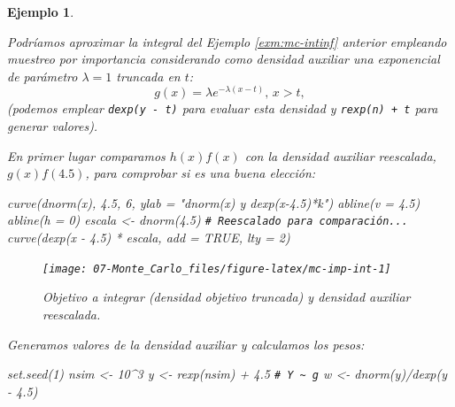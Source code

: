 \documentclass[
  10pt,
]{book}
\newenvironment{Shaded}{\begin{snugshade}}{\end{snugshade}}
\newcommand{\AttributeTok}[1]{\textcolor[rgb]{0.77,0.63,0.00}{#1}}
\newcommand{\CommentTok}[1]{\textcolor[rgb]{0.56,0.35,0.01}{\textit{#1}}}
\newcommand{\ConstantTok}[1]{\textcolor[rgb]{0.00,0.00,0.00}{#1}}
\newcommand{\DecValTok}[1]{\textcolor[rgb]{0.00,0.00,0.81}{#1}}
\newcommand{\FloatTok}[1]{\textcolor[rgb]{0.00,0.00,0.81}{#1}}
\newcommand{\FunctionTok}[1]{\textcolor[rgb]{0.00,0.00,0.00}{#1}}
\newcommand{\NormalTok}[1]{#1}
\newcommand{\OtherTok}[1]{\textcolor[rgb]{0.56,0.35,0.01}{#1}}
\newcommand{\SpecialCharTok}[1]{\textcolor[rgb]{0.00,0.00,0.00}{#1}}
\newcommand{\StringTok}[1]{\textcolor[rgb]{0.31,0.60,0.02}{#1}}
\theoremstyle{break}
\newtheorem{example}{Ejemplo}[chapter]
\theoremstyle{nonumberplain}
\renewcommand{\CommentTok}[1]{\textcolor[rgb]{0.41,0.41,0.41}{\texttt{#1}}}
\begin{document}
\begin{example}
\protect\hypertarget{exm:mc-imp}{}\label{exm:mc-imp}

Podríamos aproximar la integral del Ejemplo \ref{exm:mc-intinf} anterior empleando muestreo por importancia considerando como densidad auxiliar una exponencial de parámetro \(\lambda=1\) truncada en \(t\):
\[g(x) = \lambda e^{-\lambda (x - t)}\text{, }x>t,\]
(podemos emplear \texttt{dexp(y\ -\ t)} para evaluar esta densidad y \texttt{rexp(n)\ +\ t} para generar valores).

En primer lugar comparamos \(h(x)f(x)\) con la densidad auxiliar reescalada, \(g(x)f(4.5)\), para comprobar si es una buena elección:

\begin{Shaded}
\begin{Highlighting}[]
\FunctionTok{curve}\NormalTok{(}\FunctionTok{dnorm}\NormalTok{(x), }\FloatTok{4.5}\NormalTok{, }\DecValTok{6}\NormalTok{, }\AttributeTok{ylab =} \StringTok{"dnorm(x) y dexp(x{-}4.5)*k"}\NormalTok{)}
\FunctionTok{abline}\NormalTok{(}\AttributeTok{v =} \FloatTok{4.5}\NormalTok{)}
\FunctionTok{abline}\NormalTok{(}\AttributeTok{h =} \DecValTok{0}\NormalTok{)}
\NormalTok{escala }\OtherTok{\textless{}{-}} \FunctionTok{dnorm}\NormalTok{(}\FloatTok{4.5}\NormalTok{)  }\CommentTok{\# Reescalado para comparación...}
\FunctionTok{curve}\NormalTok{(}\FunctionTok{dexp}\NormalTok{(x }\SpecialCharTok{{-}} \FloatTok{4.5}\NormalTok{) }\SpecialCharTok{*}\NormalTok{ escala, }\AttributeTok{add =} \ConstantTok{TRUE}\NormalTok{, }\AttributeTok{lty =} \DecValTok{2}\NormalTok{)  }
\end{Highlighting}
\end{Shaded}

\begin{figure}[!htbp]

{\centering \texttt{[image: 07-Monte\_Carlo\_files/figure-latex/mc-imp-int-1]} 

}

\caption{Objetivo a integrar (densidad objetivo truncada) y densidad auxiliar reescalada.}\label{fig:mc-imp-int}
\end{figure}

Generamos valores de la densidad auxiliar y calculamos los pesos:

\begin{Shaded}
\begin{Highlighting}[]
\FunctionTok{set.seed}\NormalTok{(}\DecValTok{1}\NormalTok{)}
\NormalTok{nsim }\OtherTok{\textless{}{-}} \DecValTok{10}\SpecialCharTok{\^{}}\DecValTok{3}
\NormalTok{y }\OtherTok{\textless{}{-}} \FunctionTok{rexp}\NormalTok{(nsim) }\SpecialCharTok{+} \FloatTok{4.5}    \CommentTok{\#  Y \textasciitilde{} g}
\NormalTok{w }\OtherTok{\textless{}{-}} \FunctionTok{dnorm}\NormalTok{(y)}\SpecialCharTok{/}\FunctionTok{dexp}\NormalTok{(y }\SpecialCharTok{{-}} \FloatTok{4.5}\NormalTok{)}
\end{Highlighting}
\end{Shaded}


\end{example}
\end{document}
